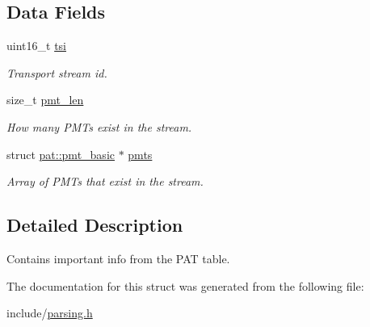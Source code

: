 \subsection*{Data Fields}
\begin{DoxyCompactItemize}
\item 
uint16\+\_\+t \hyperlink{structpat_ade45ceee5348b15b3e0d78422eff6cbe}{tsi}\hypertarget{structpat_ade45ceee5348b15b3e0d78422eff6cbe}{}\label{structpat_ade45ceee5348b15b3e0d78422eff6cbe}

\begin{DoxyCompactList}\small\item\em Transport stream id. \end{DoxyCompactList}\item 
size\+\_\+t \hyperlink{structpat_ac1d8d75f9ba19cf1dffb745fb9f41866}{pmt\+\_\+len}\hypertarget{structpat_ac1d8d75f9ba19cf1dffb745fb9f41866}{}\label{structpat_ac1d8d75f9ba19cf1dffb745fb9f41866}

\begin{DoxyCompactList}\small\item\em How many P\+M\+Ts exist in the stream. \end{DoxyCompactList}\item 
struct \hyperlink{structpat_1_1pmt__basic}{pat\+::pmt\+\_\+basic} $\ast$ \hyperlink{structpat_a6dd8e2cd3063bdb1e20711aefb88983e}{pmts}\hypertarget{structpat_a6dd8e2cd3063bdb1e20711aefb88983e}{}\label{structpat_a6dd8e2cd3063bdb1e20711aefb88983e}

\begin{DoxyCompactList}\small\item\em Array of P\+M\+Ts that exist in the stream. \end{DoxyCompactList}\end{DoxyCompactItemize}


\subsection{Detailed Description}
Contains important info from the P\+AT table. 

The documentation for this struct was generated from the following file\+:\begin{DoxyCompactItemize}
\item 
include/\hyperlink{parsing_8h}{parsing.\+h}\end{DoxyCompactItemize}

